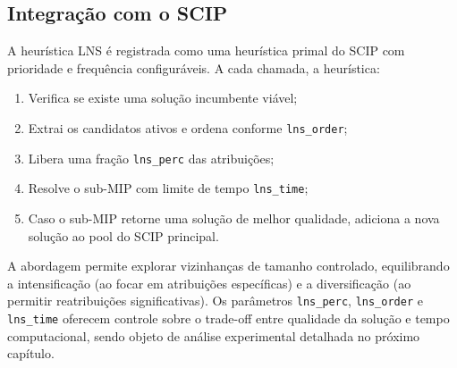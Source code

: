 \subsection{Integração com o SCIP}

A heurística LNS é registrada como uma heurística primal do SCIP com prioridade e frequência configuráveis. A cada chamada, a heurística:
\begin{enumerate}
  \item Verifica se existe uma solução incumbente viável;
  \item Extrai os candidatos ativos e ordena conforme \texttt{lns\_order};
  \item Libera uma fração \texttt{lns\_perc} das atribuições;
  \item Resolve o sub-MIP com limite de tempo \texttt{lns\_time};
  \item Caso o sub-MIP retorne uma solução de melhor qualidade, adiciona a nova solução ao pool do SCIP principal.
\end{enumerate}

A abordagem permite explorar vizinhanças de tamanho controlado, equilibrando a intensificação (ao focar em atribuições específicas) e a diversificação (ao permitir reatribuições significativas). Os parâmetros \texttt{lns\_perc}, \texttt{lns\_order} e \texttt{lns\_time} oferecem controle sobre o trade-off entre qualidade da solução e tempo computacional, sendo objeto de análise experimental detalhada no próximo capítulo.
